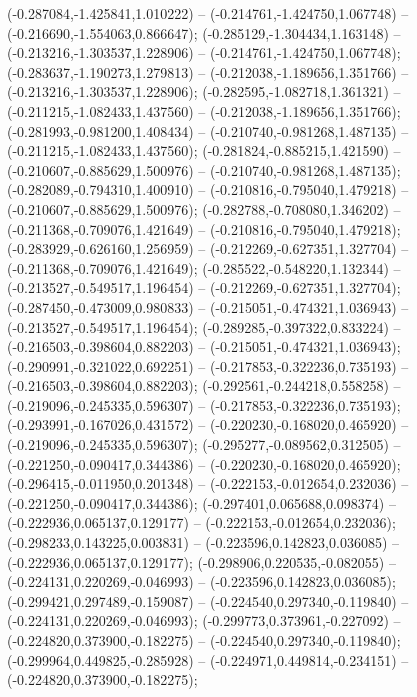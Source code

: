  (-0.287084,-1.425841,1.010222) -- (-0.214761,-1.424750,1.067748) -- (-0.216690,-1.554063,0.866647);
 (-0.285129,-1.304434,1.163148) -- (-0.213216,-1.303537,1.228906) -- (-0.214761,-1.424750,1.067748);
 (-0.283637,-1.190273,1.279813) -- (-0.212038,-1.189656,1.351766) -- (-0.213216,-1.303537,1.228906);
 (-0.282595,-1.082718,1.361321) -- (-0.211215,-1.082433,1.437560) -- (-0.212038,-1.189656,1.351766);
 (-0.281993,-0.981200,1.408434) -- (-0.210740,-0.981268,1.487135) -- (-0.211215,-1.082433,1.437560);
 (-0.281824,-0.885215,1.421590) -- (-0.210607,-0.885629,1.500976) -- (-0.210740,-0.981268,1.487135);
 (-0.282089,-0.794310,1.400910) -- (-0.210816,-0.795040,1.479218) -- (-0.210607,-0.885629,1.500976);
 (-0.282788,-0.708080,1.346202) -- (-0.211368,-0.709076,1.421649) -- (-0.210816,-0.795040,1.479218);
 (-0.283929,-0.626160,1.256959) -- (-0.212269,-0.627351,1.327704) -- (-0.211368,-0.709076,1.421649);
 (-0.285522,-0.548220,1.132344) -- (-0.213527,-0.549517,1.196454) -- (-0.212269,-0.627351,1.327704);
 (-0.287450,-0.473009,0.980833) -- (-0.215051,-0.474321,1.036943) -- (-0.213527,-0.549517,1.196454);
 (-0.289285,-0.397322,0.833224) -- (-0.216503,-0.398604,0.882203) -- (-0.215051,-0.474321,1.036943);
 (-0.290991,-0.321022,0.692251) -- (-0.217853,-0.322236,0.735193) -- (-0.216503,-0.398604,0.882203);
 (-0.292561,-0.244218,0.558258) -- (-0.219096,-0.245335,0.596307) -- (-0.217853,-0.322236,0.735193);
 (-0.293991,-0.167026,0.431572) -- (-0.220230,-0.168020,0.465920) -- (-0.219096,-0.245335,0.596307);
 (-0.295277,-0.089562,0.312505) -- (-0.221250,-0.090417,0.344386) -- (-0.220230,-0.168020,0.465920);
 (-0.296415,-0.011950,0.201348) -- (-0.222153,-0.012654,0.232036) -- (-0.221250,-0.090417,0.344386);
 (-0.297401,0.065688,0.098374) -- (-0.222936,0.065137,0.129177) -- (-0.222153,-0.012654,0.232036);
 (-0.298233,0.143225,0.003831) -- (-0.223596,0.142823,0.036085) -- (-0.222936,0.065137,0.129177);
 (-0.298906,0.220535,-0.082055) -- (-0.224131,0.220269,-0.046993) -- (-0.223596,0.142823,0.036085);
 (-0.299421,0.297489,-0.159087) -- (-0.224540,0.297340,-0.119840) -- (-0.224131,0.220269,-0.046993);
 (-0.299773,0.373961,-0.227092) -- (-0.224820,0.373900,-0.182275) -- (-0.224540,0.297340,-0.119840);
 (-0.299964,0.449825,-0.285928) -- (-0.224971,0.449814,-0.234151) -- (-0.224820,0.373900,-0.182275);
